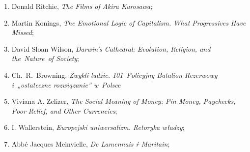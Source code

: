 \documentclass[a4paper,11pt]{article}
\begin{document}
\begin{enumerate}
\item Donald Ritchie, \emph{The Films of Akira Kurosawa};

\item Martin Konings, \emph{The Emotional Logic of Capitalism. What
    Progressives Have Missed};

\item David Sloan Wilson, \emph{Darwin's Cathedral: Evolution,
    Religion, and the~Nature~of Society};

\item Ch.~R.~Browning, \emph{Zwykli ludzie. 101~Policyjny Batalion
    Rezerwowy i~„ostateczne rozwiązanie” w~Polsce}

\item Viviana A. Zelizer, \emph{The Social Meaning of Money: Pin
    Money, Paychecks, Poor Relief, and Other Currencies};








\item I. Wallerstein, \emph{Europejski uniwersalizm. Retoryka władzy};

\item Abbé Jacques Meinvielle, \emph{De Lamennais ŕ Maritain};










\end{enumerate}
\end{document}
